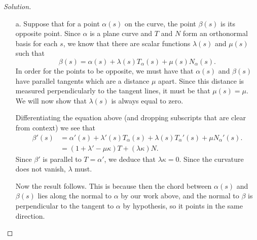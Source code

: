 \documentclass[Shifrin_Solutions_Spring_2015]{subfiles}
\begin{document}
\begin{proof}[Solution]$ \ $ \\
\begin{itemize}
\item[a.] Suppose that for a point $\alpha(s)$ on the curve, the point $\beta(s)$ is its opposite point. Since $\alpha$ is a plane curve and $T$ and $N$ form an orthonormal basis for each $s$, we know that there are scalar functions $\lambda(s)$ and $\mu(s)$ such that
\[
\beta(s) = \alpha(s) + \lambda(s) T_{\alpha}(s) + \mu(s) N_{\alpha}(s) .
\]
In order for the points to be opposite, we must have that $\alpha(s)$ and $\beta(s)$ have parallel tangents which are a distance $\mu$ apart. Since this distance is measured perpendicularly to the tangent lines, it must be that $\mu(s) = \mu$. We will now show that $\lambda(s)$ is always equal to zero.


Differentiating the equation above (and dropping subscripts that are clear from context) we see that
\[
\begin{split}
\beta'(s) & = \alpha'(s) + \lambda'(s) T_{\alpha}(s) + \lambda(s) T_{\alpha}'(s) + \mu N_{\alpha}'(s) .\\
	& = ( 1 + {\lambda}' - \mu \kappa ) T + ( \lambda \kappa ) N .
\end{split}
\]
Since $\beta'$ is parallel to $T = \alpha'$, we deduce that $\lambda\kappa= 0$. Since the curvature does not vanish, $\lambda$ must.

Now the result follows. This is because then the chord between $\alpha(s)$ and $\beta(s)$ lies along the normal to $\alpha$ by our work above, and the normal to $\beta$ is perpendicular to the tangent to $\alpha$ by hypothesis, so it points in the same direction. \\



\end{itemize}
\end{proof}
\end{document}

